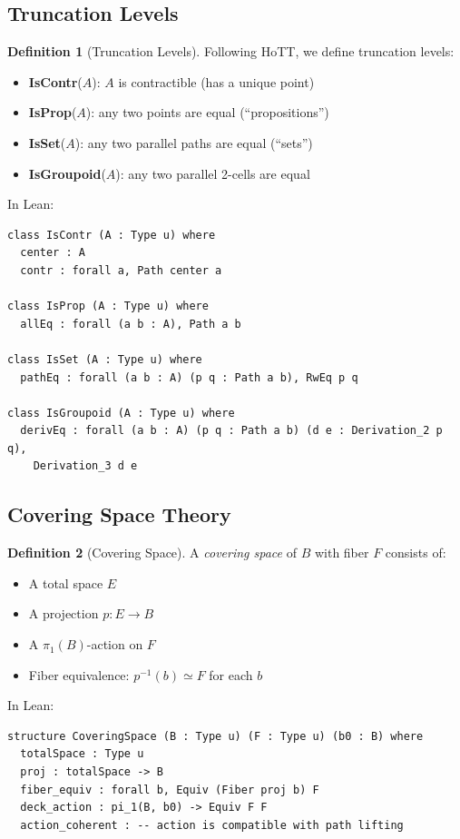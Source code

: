\documentclass{lmcs}
\theoremstyle{definition}
\newtheorem{definition}{Definition}[section]
\theoremstyle{plain}
\theoremstyle{remark}
\newcommand{\piOne}{\pi_1}
\begin{document}
\subsection{Truncation Levels}

\begin{definition}[Truncation Levels]
Following HoTT, we define truncation levels:
\begin{itemize}
    \item \textbf{IsContr}($A$): $A$ is contractible (has a unique point)
    \item \textbf{IsProp}($A$): any two points are equal (``propositions'')
    \item \textbf{IsSet}($A$): any two parallel paths are equal (``sets'')
    \item \textbf{IsGroupoid}($A$): any two parallel 2-cells are equal
\end{itemize}
\end{definition}

In Lean:
\begin{lstlisting}
class IsContr (A : Type u) where
  center : A
  contr : forall a, Path center a

class IsProp (A : Type u) where
  allEq : forall (a b : A), Path a b

class IsSet (A : Type u) where
  pathEq : forall (a b : A) (p q : Path a b), RwEq p q

class IsGroupoid (A : Type u) where
  derivEq : forall (a b : A) (p q : Path a b) (d e : Derivation_2 p q),
    Derivation_3 d e
\end{lstlisting}

\subsection{Covering Space Theory}

\begin{definition}[Covering Space]
A \emph{covering space} of $B$ with fiber $F$ consists of:
\begin{itemize}
    \item A total space $E$
    \item A projection $p : E \to B$
    \item A $\piOne(B)$-action on $F$
    \item Fiber equivalence: $p^{-1}(b) \simeq F$ for each $b$
\end{itemize}
\end{definition}

In Lean:
\begin{lstlisting}
structure CoveringSpace (B : Type u) (F : Type u) (b0 : B) where
  totalSpace : Type u
  proj : totalSpace -> B
  fiber_equiv : forall b, Equiv (Fiber proj b) F
  deck_action : pi_1(B, b0) -> Equiv F F
  action_coherent : -- action is compatible with path lifting
\end{lstlisting}
\end{document}
